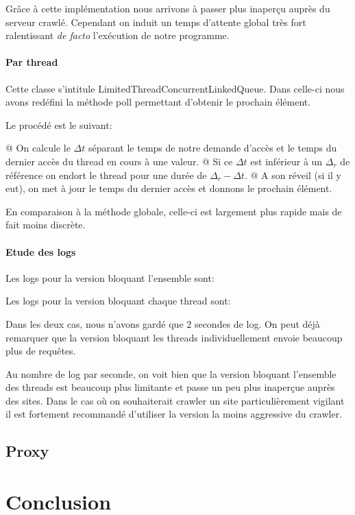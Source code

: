 \documentclass[hideweeklyreports,noposter]{polytech/polytech}
\begin{document}
				Grâce à cette implémentation nous arrivons à passer plus inaperçu auprès du serveur crawlé.
				Cependant on induit un temps d'attente global très fort ralentissant \textit{de facto} l'exécution de notre programme.
			
			\subsection{Par thread}
				Cette classe s'intitule  LimitedThreadConcurrentLinkedQueue.
				Dans celle-ci nous avons redéfini la méthode poll permettant d'obtenir le prochain élément.
				
				Le procédé est le suivant:
				\begin{easylist}[itemize]
					@ On calcule le $\Delta t$ séparant le temps de notre demande d'accès et le temps du dernier accès du thread en cours à une valeur.
					@ Si ce $\Delta t$ est inférieur à un $\Delta_r$ de référence on endort le thread pour une durée de $\Delta_r - \Delta t$.
					@ A son réveil (si il y eut), on met à jour le temps du dernier accès et donnons le prochain élément.
				\end{easylist}

				En comparaison à la méthode globale, celle-ci est largement plus rapide mais de fait moins discrète.
				
			\subsection{Etude des logs}
				Les logs pour la version bloquant l'ensemble sont:
				
				Les logs pour la version bloquant chaque thread sont:
				
				Dans les deux cas, nous n'avons gardé que 2 secondes de log.
				On peut déjà remarquer que la version bloquant les threads individuellement envoie beaucoup plus de requêtes.
				
				Au nombre de log par seconde, on voit bien que la version bloquant l'ensemble des threads est beaucoup plus limitante et passe un peu plus inaperçue auprès des sites.
				Dans le cas où on souhaiterait crawler un site particulièrement vigilant il est fortement recommandé d'utiliser la version la moins aggressive du crawler.
	
	\chapter{Proxy}
		

\part{Conclusion}

\appendix		
\end{document}
